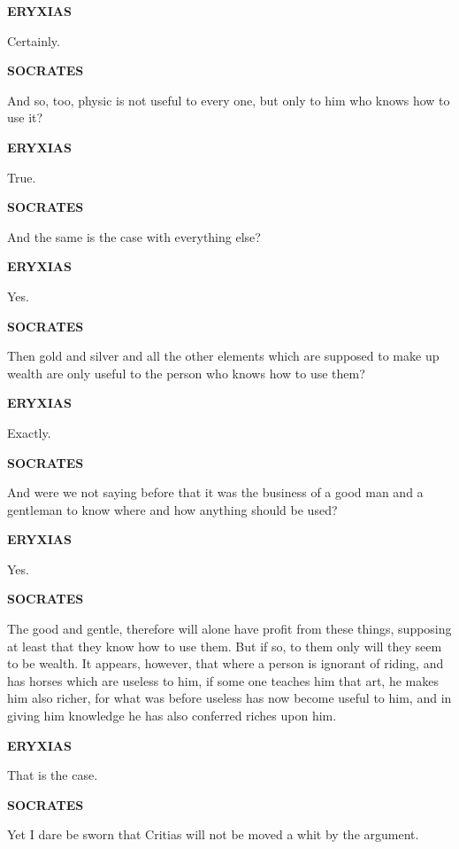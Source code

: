 \documentclass[11pt,letter]{article}
\begin{document}
\par \textbf{ERYXIAS}
\par   Certainly.

\par \textbf{SOCRATES}
\par   And so, too, physic is not useful to every one, but only to him who knows how to use it?

\par \textbf{ERYXIAS}
\par   True.

\par \textbf{SOCRATES}
\par   And the same is the case with everything else?

\par \textbf{ERYXIAS}
\par   Yes.

\par \textbf{SOCRATES}
\par   Then gold and silver and all the other elements which are supposed to make up wealth are only useful to the person who knows how to use them?

\par \textbf{ERYXIAS}
\par   Exactly.

\par \textbf{SOCRATES}
\par   And were we not saying before that it was the business of a good man and a gentleman to know where and how anything should be used?

\par \textbf{ERYXIAS}
\par   Yes.

\par \textbf{SOCRATES}
\par   The good and gentle, therefore will alone have profit from these things, supposing at least that they know how to use them. But if so, to them only will they seem to be wealth. It appears, however, that where a person is ignorant of riding, and has horses which are useless to him, if some one teaches him that art, he makes him also richer, for what was before useless has now become useful to him, and in giving him knowledge he has also conferred riches upon him.

\par \textbf{ERYXIAS}
\par   That is the case.

\par \textbf{SOCRATES}
\par   Yet I dare be sworn that Critias will not be moved a whit by the argument.
\end{document}
